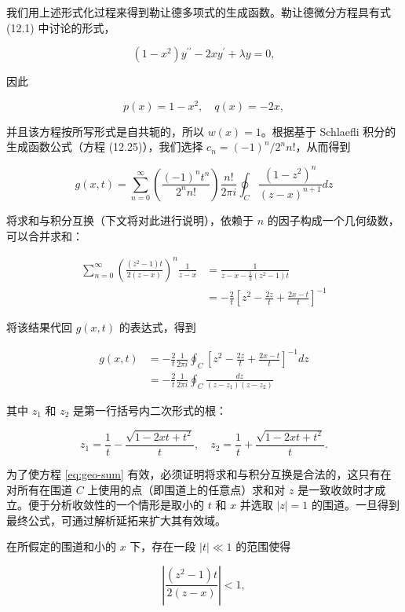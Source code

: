 我们用上述形式化过程来得到勒让德多项式的生成函数。勒让德微分方程具有式 (12.1) 中讨论的形式，

$$
\left(1-x^2\right) y^{\prime \prime}-2 x y^{\prime}+\lambda y=0,
$$

因此

$$
p(x)=1-x^2, \quad q(x)=-2 x,
$$

并且该方程按所写形式是自共轭的，所以 $w(x)=1$。根据基于 Schlaefli 积分的生成函数公式（方程 (12.25)），我们选择 $c_n=(-1)^n / 2^n n!$，从而得到

$$
g(x, t)=\sum_{n=0}^{\infty}\left(\frac{(-1)^n t^n}{2^n n!}\right) \frac{n!}{2 \pi i} \oint_C \frac{\left(1-z^2\right)^n}{(z-x)^{n+1}} d z
$$

将求和与积分互换（下文将对此进行说明），依赖于 $n$ 的因子构成一个几何级数，可以合并求和：

\begin{equation}
\begin{aligned}
\sum_{n=0}^{\infty}\left(\frac{\left(z^2-1\right) t}{2(z-x)}\right)^n \frac{1}{z-x} & =\frac{1}{z-x-\frac{1}{2}\left(z^2-1\right) t} \\
& =-\frac{2}{t}\left[z^2-\frac{2 z}{t}+\frac{2 x-t}{t}\right]^{-1}
\end{aligned}
\label{eq:geo-sum}
\end{equation}


将该结果代回 $g(x,t)$ 的表达式，得到

$$
\begin{aligned}
g(x, t) & =-\frac{2}{t} \frac{1}{2 \pi i} \oint_C\left[z^2-\frac{2 z}{t}+\frac{2 x-t}{t}\right]^{-1} d z \\
& =-\frac{2}{t} \frac{1}{2 \pi i} \oint_C \frac{d z}{\left(z-z_1\right)\left(z-z_2\right)}
\end{aligned}
$$

其中 $z_1$ 和 $z_2$ 是第一行括号内二次形式的根：

$$
z_1=\frac{1}{t}-\frac{\sqrt{1-2 x t+t^2}}{t}, \quad z_2=\frac{1}{t}+\frac{\sqrt{1-2 x t+t^2}}{t} .
$$

为了使方程 \eqref{eq:geo-sum} 有效，必须证明将求和与积分互换是合法的，这只有在对所有在围道 $C$ 上使用的点（即围道上的任意点）求和对 $z$ 是一致收敛时才成立。便于分析收敛性的一个情形是取小的 $t$ 和 $x$ 并选取 $|z|=1$ 的围道。一旦得到最终公式，可通过解析延拓来扩大其有效域。

在所假定的围道和小的 $x$ 下，存在一段 $|t|\ll 1$ 的范围使得

$$
\left|\frac{\left(z^2-1\right) t}{2(z-x)}\right|<1,
$$

